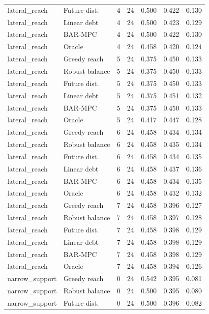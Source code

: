 \begin{longtable}{llrrrrr}
lateral\_reach & Future dist. & 4 & 24 & 0.500 & 0.422 & 0.130 \\
lateral\_reach & Linear debt & 4 & 24 & 0.500 & 0.423 & 0.129 \\
lateral\_reach & BAR-MPC & 4 & 24 & 0.500 & 0.422 & 0.130 \\
lateral\_reach & Oracle & 4 & 24 & 0.458 & 0.420 & 0.124 \\
lateral\_reach & Greedy reach & 5 & 24 & 0.375 & 0.450 & 0.133 \\
lateral\_reach & Robust balance & 5 & 24 & 0.375 & 0.450 & 0.133 \\
lateral\_reach & Future dist. & 5 & 24 & 0.375 & 0.450 & 0.133 \\
lateral\_reach & Linear debt & 5 & 24 & 0.375 & 0.451 & 0.132 \\
lateral\_reach & BAR-MPC & 5 & 24 & 0.375 & 0.450 & 0.133 \\
lateral\_reach & Oracle & 5 & 24 & 0.417 & 0.447 & 0.128 \\
lateral\_reach & Greedy reach & 6 & 24 & 0.458 & 0.434 & 0.134 \\
lateral\_reach & Robust balance & 6 & 24 & 0.458 & 0.435 & 0.134 \\
lateral\_reach & Future dist. & 6 & 24 & 0.458 & 0.434 & 0.135 \\
lateral\_reach & Linear debt & 6 & 24 & 0.458 & 0.437 & 0.136 \\
lateral\_reach & BAR-MPC & 6 & 24 & 0.458 & 0.434 & 0.135 \\
lateral\_reach & Oracle & 6 & 24 & 0.458 & 0.432 & 0.132 \\
lateral\_reach & Greedy reach & 7 & 24 & 0.458 & 0.396 & 0.127 \\
lateral\_reach & Robust balance & 7 & 24 & 0.458 & 0.397 & 0.128 \\
lateral\_reach & Future dist. & 7 & 24 & 0.458 & 0.398 & 0.129 \\
lateral\_reach & Linear debt & 7 & 24 & 0.458 & 0.398 & 0.129 \\
lateral\_reach & BAR-MPC & 7 & 24 & 0.458 & 0.398 & 0.129 \\
lateral\_reach & Oracle & 7 & 24 & 0.458 & 0.394 & 0.126 \\
narrow\_support & Greedy reach & 0 & 24 & 0.542 & 0.395 & 0.081 \\
narrow\_support & Robust balance & 0 & 24 & 0.500 & 0.395 & 0.080 \\
narrow\_support & Future dist. & 0 & 24 & 0.500 & 0.396 & 0.082 \\

\end{longtable}
